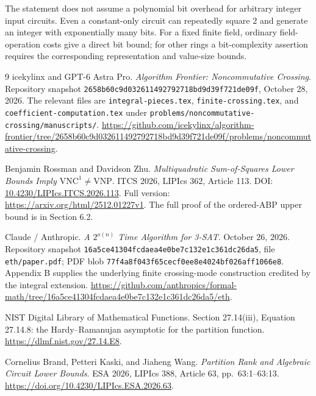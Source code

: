 \documentclass[11pt]{article}
\theoremstyle{definition}
\theoremstyle{remark}
\begin{document}
The statement does not assume a polynomial bit overhead
for arbitrary integer input circuits.  Even a constant-only
circuit can repeatedly square $2$ and generate an integer
with exponentially many bits.  For a fixed finite field,
ordinary field-operation costs give a direct bit bound;
for other rings a bit-complexity assertion requires the
corresponding representation and value-size bounds.


\begin{thebibliography}{9}
icekylinx and GPT-6 Astra Pro.
\emph{Algorithm Frontier: Noncommutative Crossing}.
Repository snapshot
\texttt{2658b60c9d032611492792718bd9d39f721de09f},
October 28, 2026.
The relevant files are
\texttt{integral-pieces.tex},
\texttt{finite-crossing.tex}, and
\texttt{coefficient-computation.tex} under
\texttt{problems/noncommutative-crossing/manuscripts/}.
\url{https://github.com/icekylinx/algorithm-frontier/tree/2658b60c9d032611492792718bd9d39f721de09f/problems/noncommutative-crossing}.

Benjamin Rossman and Davidson Zhu.
\emph{Multiquadratic Sum-of-Squares Lower Bounds Imply
$\mathrm{VNC}^1\ne\mathrm{VNP}$}.
ITCS 2026, LIPIcs 362, Article 113.
DOI: \href{https://doi.org/10.4230/LIPIcs.ITCS.2026.113}
{10.4230/LIPIcs.ITCS.2026.113}.
Full version:
\url{https://arxiv.org/html/2512.01227v1}.
The full proof of the ordered-ABP upper bound is in
Section 6.2.

Claude / Anthropic.
\emph{A $2^{o(n)}$ Time Algorithm for 3-SAT}.
October 26, 2026.
Repository snapshot
\texttt{16a5ce41304fcdaea4e0be7c132e1c361dc26da5},
file \texttt{eth/paper.pdf}; PDF blob
\texttt{77f4a8f043f65cecf0ee8e4024bf026aff1066e8}.
Appendix B supplies the underlying finite crossing-mode
construction credited by the integral extension.
\url{https://github.com/anthropics/formal-math/tree/16a5ce41304fcdaea4e0be7c132e1c361dc26da5/eth}.

NIST Digital Library of Mathematical Functions.
Section 27.14(iii), Equation 27.14.8: the
Hardy--Ramanujan asymptotic for the partition function.
\url{https://dlmf.nist.gov/27.14.E8}.


Cornelius Brand, Petteri Kaski, and Jiaheng Wang.
\emph{Partition Rank and Algebraic Circuit Lower Bounds}.
ESA 2026, LIPIcs 388, Article 63, pp.\ 63:1--63:13.
\url{https://doi.org/10.4230/LIPIcs.ESA.2026.63}.

\end{thebibliography}
\end{document}
